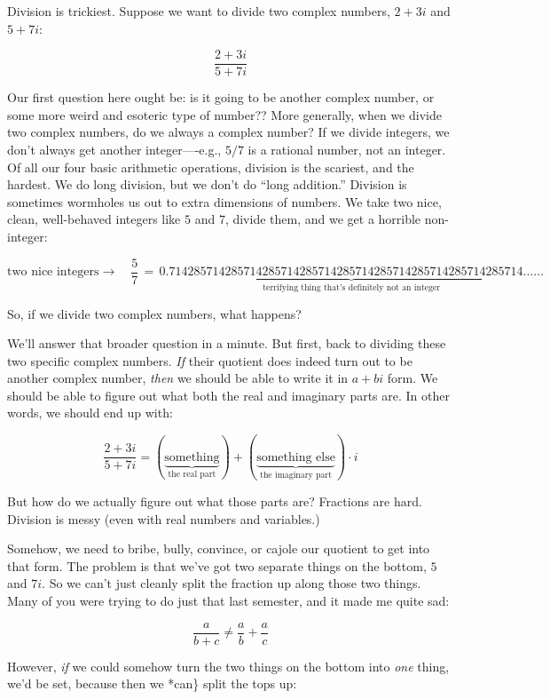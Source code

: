 \documentclass[
]{article}
\begin{document}
Division is trickiest. Suppose we want to divide two complex numbers,
\(2+3i\) and \(5+7i\):

\[\frac{2+3i}{5+7i}\]

Our first question here ought be: is it going to be another complex
number, or some more weird and esoteric type of number?? More generally,
when we divide two complex numbers, do we always a complex number? If we
divide integers, we don't always get another integer----e.g., \(5/7\) is
a rational number, not an integer. Of all our four basic arithmetic
operations, division is the scariest, and the hardest. We do long
division, but we don't do ``long addition.'' Division is sometimes
wormholes us out to extra dimensions of numbers. We take two nice,
clean, well-behaved integers like \(5\) and \(7\), divide them, and we
get a horrible non-integer:

\[\text{two nice integers} \rightarrow\quad \frac{5}{7} \,=\, \underbrace{0.714285714285714285714285714285714285714285714285714285714\dots\dots}_{\text{terrifying thing that's definitely not an integer}}\]

So, if we divide two complex numbers, what happens?

We'll answer that broader question in a minute. But first, back to
dividing these two specific complex numbers. \emph{If} their quotient
does indeed turn out to be another complex number, \emph{then} we should
be able to write it in \(a+bi\) form. We should be able to figure out
what both the real and imaginary parts are. In other words, we should
end up with:

\[\frac{2+3i}{5+7i} = (\underbrace{\text{something}}_{\text{the real part}}) + (\underbrace{\text{something else}}_{\text{the imaginary part}})\cdot i\]

But how do we actually figure out what those parts are? Fractions are
hard. Division is messy (even with real numbers and variables.)

Somehow, we need to bribe, bully, convince, or cajole our quotient to
get into that form. The problem is that we've got two separate things on
the bottom, \(5\) and \(7i\). So we can't just cleanly split the
fraction up along those two things. Many of you were trying to do just
that last semester, and it made me quite sad:

\[\frac{a}{b+c} \neq \frac{a}{b} + \frac{a}{c}\]

However, \emph{if} we could somehow turn the two things on the bottom
into \emph{one} thing, we'd be set, because then we *can\} split the
tops up:
\end{document}

